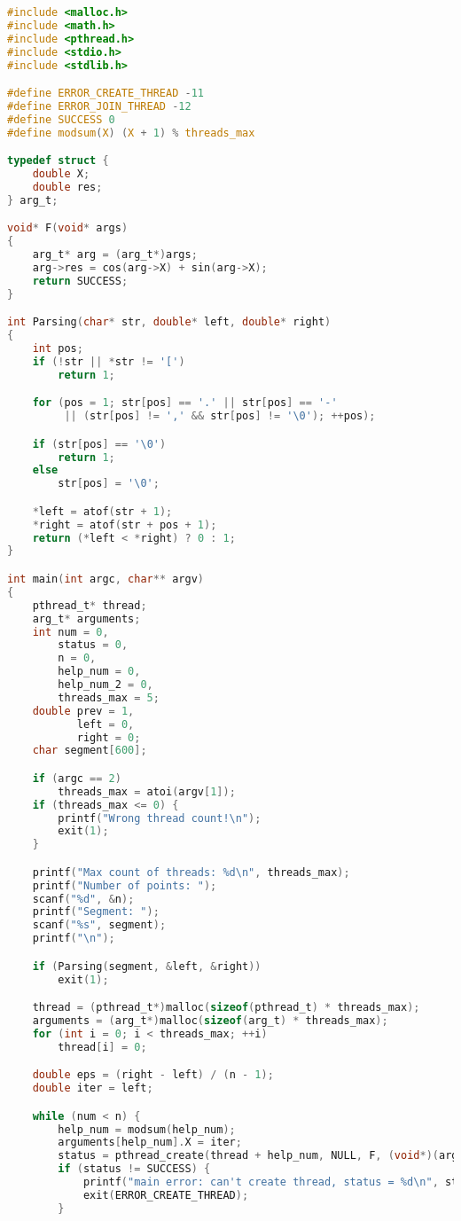 \documentclass[12pt]{article}
\begin{document}
{\scriptsize
\begin{lstlisting}[escapechar=@,language=c]
#include <malloc.h>
#include <math.h>
#include <pthread.h>
#include <stdio.h>
#include <stdlib.h>

#define ERROR_CREATE_THREAD -11
#define ERROR_JOIN_THREAD -12
#define SUCCESS 0
#define modsum(X) (X + 1) % threads_max

typedef struct {
    double X;
    double res;
} arg_t;

void* F(void* args)
{
    arg_t* arg = (arg_t*)args;
    arg->res = cos(arg->X) + sin(arg->X);
    return SUCCESS;
}

int Parsing(char* str, double* left, double* right)
{
    int pos;
    if (!str || *str != '[')
        return 1;

    for (pos = 1; str[pos] == '.' || str[pos] == '-' 
         || (str[pos] != ',' && str[pos] != '\0'); ++pos);

    if (str[pos] == '\0')
        return 1;
    else
        str[pos] = '\0';

    *left = atof(str + 1);
    *right = atof(str + pos + 1);
    return (*left < *right) ? 0 : 1;
}

int main(int argc, char** argv)
{
    pthread_t* thread;
    arg_t* arguments;
    int num = 0,
        status = 0,
        n = 0,
        help_num = 0,
        help_num_2 = 0,
        threads_max = 5;
    double prev = 1,
           left = 0,
           right = 0;
    char segment[600];

    if (argc == 2)
        threads_max = atoi(argv[1]);
    if (threads_max <= 0) {
        printf("Wrong thread count!\n");
        exit(1);
    }

    printf("Max count of threads: %d\n", threads_max);
    printf("Number of points: ");
    scanf("%d", &n);
    printf("Segment: ");
    scanf("%s", segment);
    printf("\n");

    if (Parsing(segment, &left, &right))
        exit(1);

    thread = (pthread_t*)malloc(sizeof(pthread_t) * threads_max);
    arguments = (arg_t*)malloc(sizeof(arg_t) * threads_max);
    for (int i = 0; i < threads_max; ++i)
        thread[i] = 0;

    double eps = (right - left) / (n - 1);
    double iter = left;

    while (num < n) {
        help_num = modsum(help_num);
        arguments[help_num].X = iter;
        status = pthread_create(thread + help_num, NULL, F, (void*)(arguments + help_num));
        if (status != SUCCESS) {
            printf("main error: can't create thread, status = %d\n", status);
            exit(ERROR_CREATE_THREAD);
        }


\end{lstlisting}}
\end{document}
